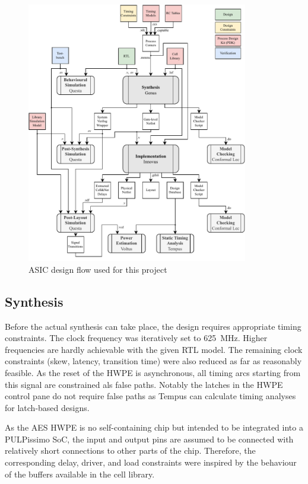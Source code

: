 \documentclass[a4paper, 12pt]{article}
\begin{document}
\begin{figure} [h]
	\centering
	\includegraphics[width=0.86\textwidth]{design-flow.pdf}
	\caption{ASIC design flow used for this project}
	\label{fig:asic-flow}
\end{figure}

\clearpage

\subsection{Synthesis} \label{sec:asic:synthesis}

Before the actual synthesis can take place, the design requires appropriate timing constraints. The clock frequency was iteratively set to \SI{625}{MHz}. Higher frequencies are hardly achievable with the given RTL model. The remaining clock constraints (skew, latency, transition time) were also reduced as far as reasonably feasible. As the reset of the HWPE is asynchronous, all timing arcs starting from this signal are constrained als false paths. Notably the latches in the HWPE control pane do not require false paths as Tempus can calculate timing analyses for latch-based designs.

As the AES HWPE is no self-containing chip but intended to be integrated into a PULPissimo SoC, the input and output pins are assumed to be connected with relatively short connections to other parts of the chip. Therefore, the corresponding delay, driver, and load constraints were inspired by the behaviour of the buffers available in the cell library.
\end{document}
